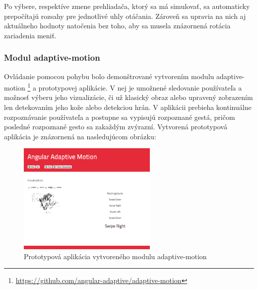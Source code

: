
Po výbere, respektíve zmene prehliadača, ktorý sa má simulovať, sa automaticky prepočítajú rozsahy pre jednotlivé uhly otáčania. Zároveň sa upravia na nich aj aktuálneho hodnoty natočenia bez toho, aby sa musela znázornená rotácia zariadenia meniť.




\subsubsection{Modul adaptive-motion} %
\label{sub:adaptive_motion}

Ovládanie pomocou pohybu bolo demonštrované vytvorením modulu adaptive-motion \footnote{\url{https://github.com/angular-adaptive/adaptive-motion}} a prototypovej aplikácie. V nej je umožnené sledovanie používateľa a možnosť výberu jeho vizualizácie, či už klasický obraz alebo upravený zobrazením len detekovaním jeho kože alebo detekciou hrán. V aplikácii prebieha kontinuálne rozpoznávanie používateľa a postupne sa vypisujú rozpoznané gestá, pričom posledné rozpoznané gesto sa zakaždým zvýrazní. Vytvorená prototypová aplikácia je znázornená na nasledujúcom obrázku:

\begin{figure}[H]
  \centering
  \includegraphics[width=0.6\textwidth]{img/adaptivemotion.png}
  \caption[Prototypová aplikácia vytvoreného modulu adaptive-motion]{
    Prototypová aplikácia vytvoreného modulu adaptive-motion}
  \label{fig: adaptivemotion}
\end{figure}

